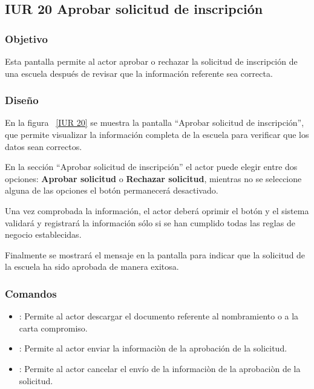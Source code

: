 \subsection{IUR 20 Aprobar solicitud de inscripción}

\subsubsection{Objetivo}
	
    Esta pantalla permite al actor  aprobar o rechazar la solicitud de inscripción de una escuela después de revisar que la información referente sea correcta.
\subsubsection{Diseño}

    En la figura ~\ref{IUR 20} se muestra la pantalla ``Aprobar solicitud de inscripción'', que permite visualizar la información completa de la escuela para verificar que los datos sean correctos.
    
    En la sección ``Aprobar solicitud de inscripción'' el actor puede elegir entre dos opciones: {\bf Aprobar solicitud} o {\bf Rechazar solicitud}, mientras no se seleccione alguna de las opciones el botón  permanecerá desactivado.
    
    Una vez comprobada la información, el actor deberá oprimir el botón  y  el sistema validará y registrará la información sólo si se han cumplido todas las reglas de negocio establecidas.
    
    Finalmente se mostrará el mensaje  en la pantalla  para indicar que la solicitud de la escuela ha sido aprobada de manera exitosa.
    
    
\subsubsection{Comandos}
    \begin{itemize}
	\item {}: Permite al actor descargar el documento referente al nombramiento o a la carta compromiso.
	\item {}: Permite al actor enviar la informaciòn de la aprobación de la solicitud.
	\item {}: Permite al actor cancelar el envío de la informaciòn de la aprobaciòn de la solicitud.
	
    \end{itemize}

